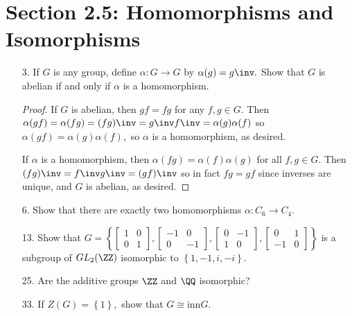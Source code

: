 \documentclass{article}
\begin{document}
\section*{Section 2.5: Homomorphisms and Isomorphisms}
\begin{itemize}
	\item[3.] If $G$ is any group, define $\alpha:G\to G$ by $\alpha(g)=g\inv.$ Show that $G$ is abelian if and only if $\alpha$ is a homomorphism.
		\begin{proof}
			If $G$ is abelian, then $gf=fg$ for any $f, g\in G.$ Then $\alpha(gf)=\alpha(fg)=(fg)\inv=g\inv f\inv = \alpha(g) \alpha(f)$ so $\alpha(gf)=\alpha(g)\alpha(f),$ so $\alpha$ is a homomorphism, as desired.

			If $\alpha$ is a homomorphism, then $\alpha(fg)=\alpha(f)\alpha(g)$ for all $f, g\in G.$ Then $(fg)\inv=f\inv g\inv = (gf)\inv$ so in fact $fg=gf$ since inverses are unique, and $G$ is abelian, as desired.
			
		\end{proof}

	\item[6.] Show that there are exactly two homomorphisms $\alpha:C_6\to C_4.$

	\item[13.] Show that $G=\left\{ \begin{bmatrix}
			1 & 0 \\ 0 & 1
		\end{bmatrix}, \begin{bmatrix}
			-1 & 0 \\ 0 & -1
		\end{bmatrix}, \begin{bmatrix}
			0 & -1 \\ 1 & 0 
		\end{bmatrix}, \begin{bmatrix}
			0 & 1 \\ -1 & 0
		\end{bmatrix}\right\}$ is a subgroup of $GL_2(\ZZ)$ isomorphic to $\left\{ 1, -1, i, -i \right\}.$

	\item[25.] Are the additive groups $\ZZ$ and $\QQ$ isomorphic? 

	\item[33.] If $Z(G)=\left\{ 1 \right\},$ show that $G\cong\text{inn}G.$

\end{itemize}
\end{document}
